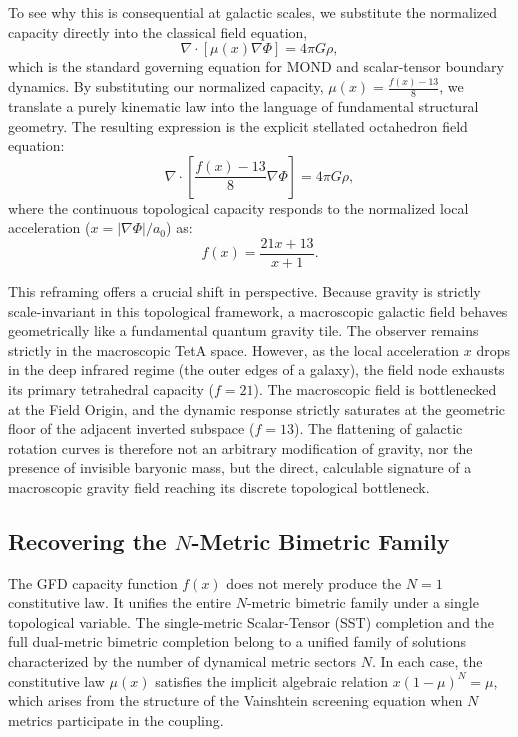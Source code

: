 \documentclass[twocolumn]{iopjournal}
\begin{document}
To see why this is consequential at galactic scales, we substitute the normalized capacity directly into the classical field equation,
\begin{equation}
\nabla \cdot \left[ \mu(x) \nabla\Phi \right] = 4\pi G\rho,
\end{equation}
which is the standard governing equation for MOND and scalar-tensor boundary dynamics. By substituting our normalized capacity, $\mu(x) = \frac{f(x) - 13}{8}$, we translate a purely kinematic law into the language of fundamental structural geometry. The resulting expression is the explicit stellated octahedron field equation:
\begin{equation}
\nabla \cdot \left[ \frac{f(x) - 13}{8} \nabla\Phi \right] = 4\pi G\rho,
\end{equation}
where the continuous topological capacity responds to the normalized local acceleration ($x = |\nabla\Phi|/a_0$) as:
\begin{equation}
f(x) = \frac{21x + 13}{x + 1}.
\end{equation}

This reframing offers a crucial shift in perspective. Because gravity is strictly scale-invariant in this topological framework, a macroscopic galactic field behaves geometrically like a fundamental quantum gravity tile. The observer remains strictly in the macroscopic TetA space. However, as the local acceleration $x$ drops in the deep infrared regime (the outer edges of a galaxy), the field node exhausts its primary tetrahedral capacity ($f=21$). The macroscopic field is bottlenecked at the Field Origin, and the dynamic response strictly saturates at the geometric floor of the adjacent inverted subspace ($f=13$). The flattening of galactic rotation curves is therefore not an arbitrary modification of gravity, nor the presence of invisible baryonic mass, but the direct, calculable signature of a macroscopic gravity field reaching its discrete topological bottleneck.

\subsection*{Recovering the $N$-Metric Bimetric Family}
The GFD capacity function $f(x)$ does not merely produce the $N = 1$ constitutive law. It unifies the entire $N$-metric bimetric family under a single topological variable. The single-metric Scalar-Tensor (SST) completion and the full dual-metric bimetric completion belong to a unified family of solutions characterized by the number of dynamical metric sectors $N$. In each case, the constitutive law $\mu(x)$ satisfies the implicit algebraic relation $x(1 - \mu)^N = \mu$, which arises from the structure of the Vainshtein screening equation when $N$ metrics participate in the coupling.
\end{document}
